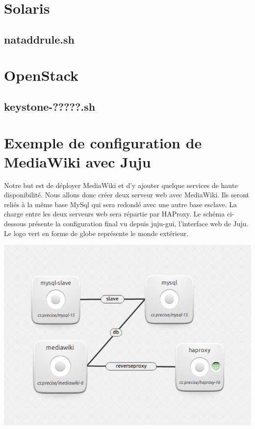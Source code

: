 \documentclass[a4paper,oneside]{report}
\begin{document}
\section{Solaris}
\subsection{nataddrule.sh}

\section{OpenStack}
\subsection{keystone-?????.sh} \label{script:keystoneData}

\section{Exemple de configuration de MediaWiki avec Juju} \label{auto:juju}

Notre but est de déployer MediaWiki et d'y ajouter quelque services de haute disponibilité. Nous allons donc créer deux serveur web avec MediaWiki. Ils seront reliés à la même base MySql qui sera redondé avec une autre base esclave. La charge entre les deux serveurs web sera répartie par HAProxy. Le schéma ci-dessous présente la configuration final vu depuis juju-gui, l'interface web de Juju. Le logo vert en forme de globe représente le monde extérieur.
\begin{center}
\includegraphics[scale=0.75]{images/butJuju.png}
\end{center}
\end{document}
